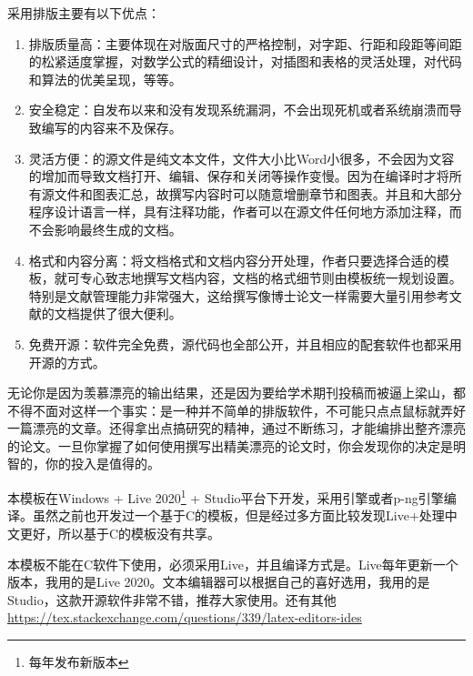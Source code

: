 采用排版主要有以下优点：
\begin{enumerate}	
    \item 排版质量高：主要体现在对版面尺寸的严格控制，对字距、行距和段距等间距的松紧适度掌握，对数学公式的精细设计，对插图和表格的灵活处理，对代码和算法的优美呈现，等等。
    \item 安全稳定：自发布以来和没有发现系统漏洞，不会出现死机或者系统崩溃而导致编写的内容来不及保存。
    \item 灵活方便：的源文件是纯文本文件，文件大小比Word小很多，不会因为文容的增加而导致文档打开、编辑、保存和关闭等操作变慢。因为在编译时才将所有源文件和图表汇总，故撰写内容时可以随意增删章节和图表。并且和大部分程序设计语言一样，具有注释功能，作者可以在源文件任何地方添加注释，而不会影响最终生成的文档。
    \item 格式和内容分离：将文档格式和文档内容分开处理，作者只要选择合适的模板，就可专心致志地撰写文档内容，文档的格式细节则由模板统一规划设置。特别是文献管理能力非常强大，这给撰写像博士论文一样需要大量引用参考文献的文档提供了很大便利。
	\item 免费开源：软件完全免费，源代码也全部公开，并且相应的配套软件也都采用开源的方式。
\end{enumerate}

无论你是因为羡慕漂亮的输出结果，还是因为要给学术期刊投稿而被逼上梁山，都不得不面对这样一个事实：是一种并不简单的排版软件，不可能只点点鼠标就弄好一篇漂亮的文章。还得拿出点搞研究的精神，通过不断练习，才能编排出整齐漂亮的论文。一旦你掌握了如何使用撰写出精美漂亮的论文时，你会发现你的决定是明智的，你的投入是值得的。


本模板在Windows + Live 2020\footnote{每年发布新版本} + Studio平台下开发，采用引擎或者p-ng引擎编译。虽然之前也开发过一个基于C的模板，但是经过多方面比较发现Live+处理中文更好，所以基于C的模板没有共享。

{\color{red}本模板不能在C软件下使用，必须采用Live，并且编译方式是。Live每年更新一个版本，我用的是Live 2020。文本编辑器可以根据自己的喜好选用，我用的是Studio，这款开源软件非常不错，推荐大家使用。还有其他\url{https://tex.stackexchange.com/questions/339/latex-editors-ides}}

